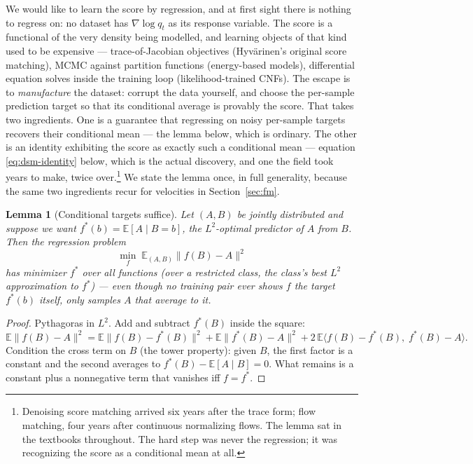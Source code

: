 \documentclass[10pt,a4paper]{article}
\newtheorem{lemma}{Lemma}
\newcommand{\E}{\mathbb{E}}
\begin{document}
We would like to learn the score by regression, and at first sight there
is nothing to regress on: no dataset has $\nabla \log q_t$ as its
response variable. The score is a functional of the very density being
modelled, and learning objects of that kind used to be expensive ---
trace-of-Jacobian objectives (Hyv\"arinen's original score matching),
MCMC against partition functions (energy-based models), differential
equation solves inside the training loop (likelihood-trained CNFs). The
escape is to \emph{manufacture} the dataset: corrupt the data yourself,
and choose the per-sample prediction target so that its conditional
average is provably the score. That takes two ingredients. One is a
guarantee that regressing on noisy per-sample targets recovers their
conditional mean --- the lemma below, which is ordinary. The other is an
identity exhibiting the score as exactly such a conditional mean ---
equation \eqref{eq:dsm-identity} below, which is the actual discovery,
and one the field took years to make, twice over.\footnote{Denoising
score matching arrived six years after the trace form; flow matching,
four years after continuous normalizing flows. The lemma sat in the
textbooks throughout. The hard step was never the regression; it was
recognizing the score as a conditional mean at all.} We state the lemma
once, in full generality, because the same two ingredients recur for
velocities in Section~\ref{sec:fm}.

\begin{lemma}[Conditional targets suffice]
\label{lem:proj}
Let $(A, B)$ be jointly distributed and suppose we want
$f^\ast(b) = \E[A \mid B = b]$, the $L^2$-optimal predictor of $A$ from
$B$. Then the regression problem
\begin{equation}
\min_f\; \E_{(A,B)} \big\| f(B) - A \big\|^2
\end{equation}
has minimizer $f^\ast$ over all functions (over a restricted class, the
class's best $L^2$ approximation to $f^\ast$) --- even though no
training pair ever shows $f$ the target $f^\ast(b)$ itself, only
samples $A$ that average to it.
\end{lemma}

\begin{proof}
Pythagoras in $L^2$. Add and subtract $f^\ast(B)$ inside the square:
\begin{equation*}
\E\big\| f(B) - A \big\|^2
= \E\big\| f(B) - f^\ast(B) \big\|^2
+ \E\big\| f^\ast(B) - A \big\|^2
+ 2\,\E\big\langle f(B) - f^\ast(B),\; f^\ast(B) - A \big\rangle .
\end{equation*}
Condition the cross term on $B$ (the tower property): given $B$, the
first factor is a constant and the second averages to
$f^\ast(B) - \E[A \mid B] = 0$. What remains is a constant plus a
nonnegative term that vanishes iff $f = f^\ast$.
\end{proof}
\end{document}
